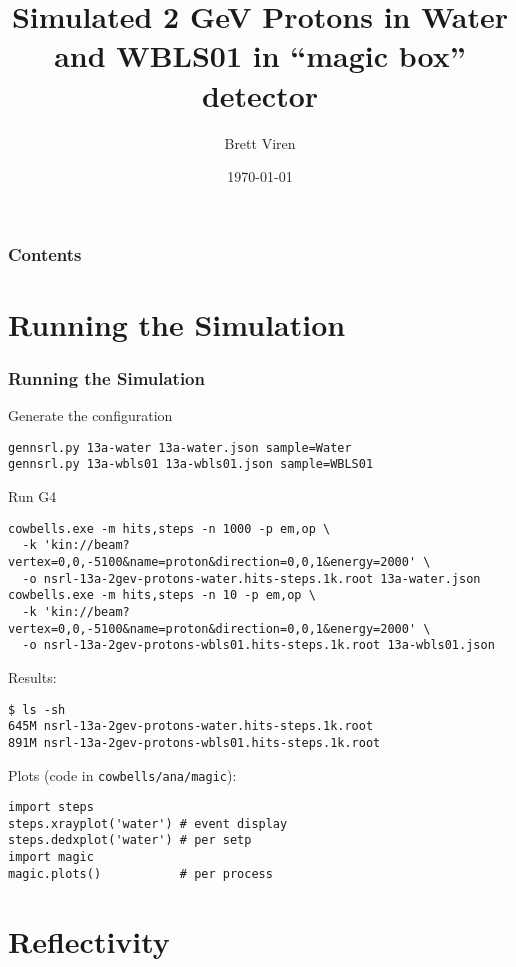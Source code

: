 \documentclass[xcolor=dvipsnames]{beamer}
\begin{document}
\title{Simulated 2 GeV Protons in Water and WBLS01 in ``magic box'' detector}
\author{Brett Viren}
\date{\today}
\frame{\titlepage}

\begin{frame}
  \frametitle{Contents}
  \tableofcontents
\end{frame}


\section{Running the Simulation}
\label{sec:gen}

\begin{frame}[fragile]
  \frametitle{Running the Simulation}

  Generate the configuration

{\tiny
\begin{verbatim}
gennsrl.py 13a-water 13a-water.json sample=Water
gennsrl.py 13a-wbls01 13a-wbls01.json sample=WBLS01
\end{verbatim}
}

  Run G4

{\tiny
\begin{verbatim}
cowbells.exe -m hits,steps -n 1000 -p em,op \
  -k 'kin://beam?vertex=0,0,-5100&name=proton&direction=0,0,1&energy=2000' \
  -o nsrl-13a-2gev-protons-water.hits-steps.1k.root 13a-water.json 
cowbells.exe -m hits,steps -n 10 -p em,op \
  -k 'kin://beam?vertex=0,0,-5100&name=proton&direction=0,0,1&energy=2000' \
  -o nsrl-13a-2gev-protons-wbls01.hits-steps.1k.root 13a-wbls01.json
\end{verbatim}
}

 Results:
{\tiny
\begin{verbatim}
$ ls -sh
645M nsrl-13a-2gev-protons-water.hits-steps.1k.root
891M nsrl-13a-2gev-protons-wbls01.hits-steps.1k.root
\end{verbatim}
}

Plots (code in \texttt{cowbells/ana/magic}):
  \begin{lstlisting}[lang=python]
import steps
steps.xrayplot('water') # event display
steps.dedxplot('water') # per setp
import magic
magic.plots()           # per process
  \end{lstlisting}

\end{frame}


\section{Reflectivity}
\end{document}
